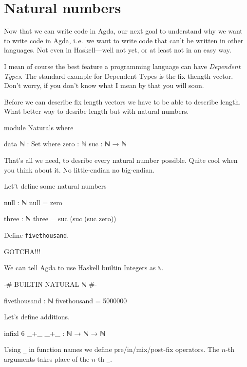 \section{Natural numbers}
Now that we can write code in Agda, our next goal to understand why we
want to write code in Agda, i. e. we want to write code that can’t be
written in other languages. Not even in Haskell—well not yet, or at
least not in an easy way.

I mean of course the best feature a programming language can have
\emph{Dependent Types}. The standard example for Dependent Types is the
fix thength vector. Don’t worry, if you don’t know what I mean by that
you will soon.

Before we can describe fix length vectors we have to be able to describe
length. What better way to desribe length but with natural numbers.

\begin{code}
module Naturals where

data ℕ : Set where
  zero : ℕ
  suc : ℕ → ℕ
\end{code}

That's all we need, to desribe every natural number possible.
Quite cool when you think about it. No little-endian no big-endian.

Let't define some natural numbers

\begin{code}
null : ℕ
null = zero

three : ℕ
three = suc (suc (suc zero))
\end{code}

\begin{exercise}
  Define \verb+fivethousand+.
\end{exercise}

GOTCHA!!!

We can tell Agda to use Haskell builtin Integers as \verb+ℕ+.

\begin{code}
{-# BUILTIN NATURAL ℕ #-}

fivethousand : ℕ
fivethousand = 5000000
\end{code}

Let's define additions.

\begin{code}
infixl 6 _+_
_+_ : ℕ → ℕ → ℕ
\end{code}

Using \verb+_+ in function names we define pre/in/mix/post-fix operators. The
$n$-th arguments takes place of the $n$-th \verb+_+.

